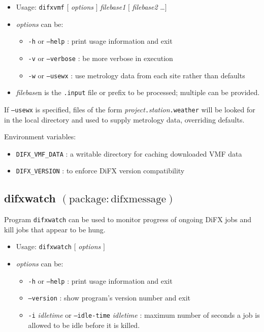 \begin{itemize}
\item[] Usage: {\tt difxvmf} $[$ {\em options} $]$ {\em filebase1} $[$ {\em filebase2} \ldots $]$
\item[] {\em options} can be:
\begin{itemize}
\item[] {\tt -h} or {\tt --help} : print usage information and exit
\item[] {\tt -v} or {\tt --verbose} : be more verbose in execution
\item[] {\tt -w} or {\tt --usewx} : use metrology data from each site rather than defaults
\end{itemize}
\item[] {\em filebase}n is the {\tt .input} file or prefix to be processed; multiple can be provided.
\end{itemize}

If {\tt --usewx} is specified, files of the form {\em project}{\tt .}{\em station}{\tt .weather} will be looked for in the local directory and used to supply metrology data, overriding defaults.

\noindent Environment variables:
\begin{itemize}
\item[] {\tt DIFX\_VMF\_DATA} : a writable directory for caching downloaded VMF data
\item[] {\tt DIFX\_VERSION} : to enforce DiFX version compatibility
\end{itemize}




\subsection{difxwatch {\small $\mathrm{(package: difxmessage)}$}} \label{sec:difxwatch} 

Program {\tt difxwatch} can be used to monitor progress of ongoing DiFX jobs and kill jobs that appear to be hung.

\begin{itemize}
\item[] Usage: {\tt difxwatch} $[$ {\em options} $]$ 
\item[] {\em options} can be:
\begin{itemize}
\item[] {\tt -h} or {\tt --help} : print usage information and exit
\item[] {\tt --version} : show program's version number and exit
\item[] {\tt -i} {\em idletime} or {\tt --idle-time} {\em idletime} : maximum number of seconds a job is allowed to be idle before it is killed.
\end{itemize}
\end{itemize}





